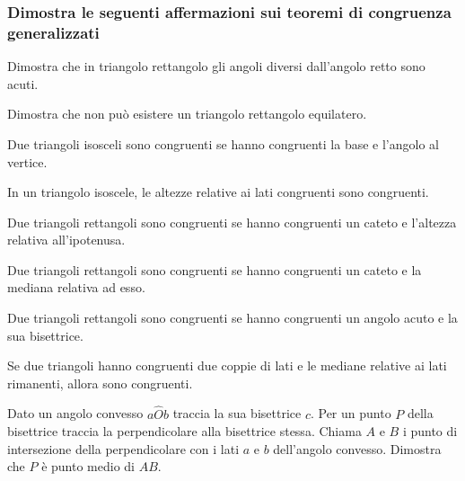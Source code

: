 \begin{multicols}{2}
\subsubsection*{Dimostra le seguenti affermazioni sui teoremi di 
congruenza generalizzati}
\begin{multicols}{2}

\begin{esercizio}
\label{ese:3.53}
Dimostra che in triangolo rettangolo gli angoli diversi dall'angolo 
retto sono acuti.
\end{esercizio}

\begin{esercizio}
\label{ese:3.54}
Dimostra che non può esistere un triangolo rettangolo equilatero.
\end{esercizio}

\begin{esercizio}
\label{ese:3.55}
Due triangoli isosceli sono congruenti se hanno congruenti la base e 
l'angolo al vertice.
\end{esercizio}

\begin{esercizio}
\label{ese:3.56}
In un triangolo isoscele, le altezze relative ai lati congruenti sono 
congruenti. 
\end{esercizio}

\begin{esercizio}
\label{ese:3.57}
Due triangoli rettangoli sono congruenti se hanno congruenti un 
cateto e l'altezza relativa all'ipotenusa.
\end{esercizio}

\begin{esercizio}
\label{ese:3.58}
Due triangoli rettangoli sono congruenti se hanno congruenti un 
cateto e la mediana relativa ad esso.
\end{esercizio}

\begin{esercizio}
\label{ese:3.59}
Due triangoli rettangoli sono congruenti se hanno congruenti un 
angolo acuto e la sua bisettrice.
\end{esercizio}

\begin{esercizio}
\label{ese:3.60}
Se due triangoli hanno congruenti due coppie di lati e le mediane 
relative ai lati rimanenti, allora sono congruenti.
\end{esercizio}

\begin{esercizio}
\label{ese:3.69}
Dato un angolo convesso $a\widehat{O}b$ traccia la sua bisettrice 
$c$. Per un punto $P$ della bisettrice traccia la perpendicolare alla 
bisettrice stessa. Chiama $A$ e $B$ i punto di intersezione della 
perpendicolare con i lati $a$ e $b$ dell'angolo convesso. Dimostra 
che $P$ è punto medio di $AB$.
\end{esercizio}


\end{multicols}
\end{multicols}
